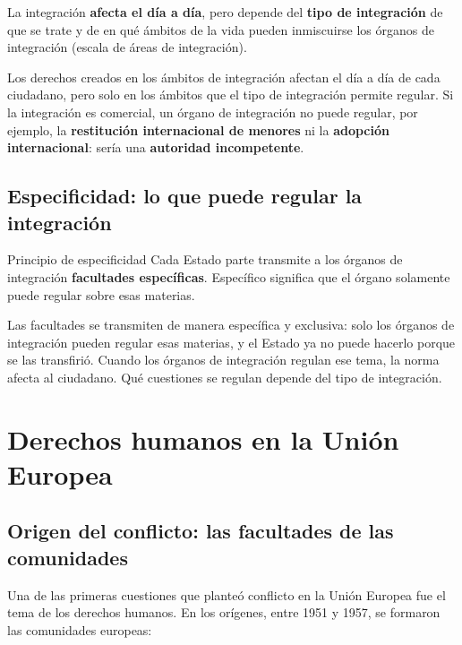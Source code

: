 \documentclass[12pt,oneside]{book}
\begin{document}
La integración \textbf{afecta el día a día}, pero depende del \textbf{tipo de integración} de que se trate y de en qué ámbitos de la vida pueden inmiscuirse los órganos de integración (escala de áreas de integración).

\begin{important}
Los derechos creados en los ámbitos de integración afectan el día a día de cada ciudadano, pero solo en los ámbitos que el tipo de integración permite regular. Si la integración es comercial, un órgano de integración no puede regular, por ejemplo, la \textbf{restitución internacional de menores} ni la \textbf{adopción internacional}: sería una \textbf{autoridad incompetente}.
\end{important}

\section{Especificidad: lo que puede regular la integración}

\begin{definition}{Principio de especificidad}
Cada Estado parte transmite a los órganos de integración \textbf{facultades específicas}. Específico significa que el órgano solamente puede regular sobre esas materias.
\end{definition}

Las facultades se transmiten de manera específica y exclusiva: solo los órganos de integración pueden regular esas materias, y el Estado ya no puede hacerlo porque se las transfirió. Cuando los órganos de integración regulan ese tema, la norma afecta al ciudadano. Qué cuestiones se regulan depende del tipo de integración.

\chapter[Derechos humanos en la UE]{Derechos humanos en la Unión Europea}

\section{Origen del conflicto: las facultades de las comunidades}

Una de las primeras cuestiones que planteó conflicto en la Unión Europea fue el tema de los derechos humanos. En los orígenes, entre 1951 y 1957, se formaron las comunidades europeas:
\end{document}
